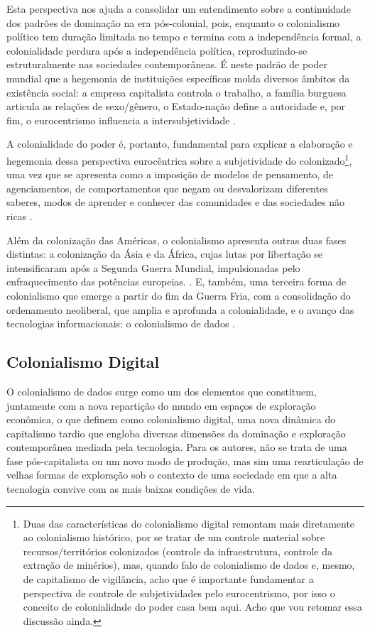 Esta perspectiva nos ajuda a consolidar um entendimento sobre a continuidade dos padrões de dominação na era pós-colonial, pois, enquanto o colonialismo político tem duração limitada no tempo e termina com a independência formal, a colonialidade perdura após a independência política, reproduzindo-se estruturalmente nas sociedades contemporâneas. É neste padrão de poder mundial que a hegemonia de instituições específicas molda diversos âmbitos da existência social: a empresa capitalista controla o trabalho, a família burguesa articula as relações de sexo/gênero, o Estado-nação define a autoridade e, por fim, o eurocentrismo influencia a intersubjetividade
\cite{quijano2005}.

A colonialidade do poder é, portanto, fundamental para explicar a elaboração e hegemonia dessa perspectiva eurocêntrica sobre a subjetividade do colonizado\footnote{
Duas das características do colonialismo digital remontam mais diretamente ao colonialismo histórico, por se tratar de um controle material sobre recursos/territórios colonizados (controle da infraestrutura, controle da extração de minérios), mas, quando falo de colonialismo de dados e, mesmo, de capitalismo de vigilância, acho que é importante fundamentar a perspectiva de controle de subjetividades pelo eurocentrismo, por isso o conceito de colonialidade do poder casa bem aqui. Acho que vou retomar essa discussão ainda.
}, uma vez que se apresenta como a imposição de modelos de pensamento, de agenciamentos, de comportamentos que negam ou desvalorizam diferentes saberes, modos de aprender e conhecer das comunidades e das sociedades não ricas \cite{Silveira2021}.

Além da colonização das Américas, o colonialismo apresenta outras duas fases distintas: a colonização da Ásia e da África, cujas lutas por libertação se intensificaram após a Segunda Guerra Mundial, impulsionadas pelo enfraquecimento das potências europeias. \cite{beuron2024}. E, também, uma terceira forma de colonialismo que emerge a partir do fim da Guerra Fria, com a consolidação do ordenamento neoliberal, que amplia e aprofunda a colonialidade, e o avanço das tecnologias informacionais: o colonialismo de dados \cite{beuron2024, Silveira2021}.

\subsection{Colonialismo Digital}
\label{subsec:colDigital}

O colonialismo de dados surge como um dos elementos que constituem, juntamente com a nova repartição do mundo em espaços de exploração econômica, o que  definem como colonialismo digital, uma nova dinâmica do capitalismo tardio que engloba diversas dimensões da dominação e exploração contemporânea mediada pela tecnologia. Para os autores, não se trata de uma fase pós-capitalista ou um novo modo de produção, mas sim uma rearticulação de velhas formas de exploração sob o contexto de uma sociedade em que a alta tecnologia convive com as mais baixas condições de vida.

